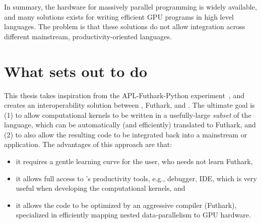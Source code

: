 
In summary, the hardware for massively parallel programming is widely available,
and many solutions exists for writing efficient GPU programs in high level
languages. The problem is that these solutions do not allow integration across
different mainstream, productivity-oriented languages.



\section{What \fshark{} sets out to do}

This thesis takes inspiration from the APL-Futhark-Python experiment~\cite{apltail}, 
and creates an interoperability solution between \fsharp{}, Futhark, and \csharp{}.
The ultimate goal is (1) to allow computational kernels to be written in a usefully-large
{\em subset} of the \fsharp{} language, which can be automatically (and efficiently)
translated to Futhark, and (2) to also allow the resulting code to be integrated
back into a mainstream \csharp{} or \fsharp{} application. 
The advantages of this approach are that:
\begin{itemize}
    \item it requires a gentle learning curve for the user, who needs not learn Futhark, 
    \item it allows full access to \fsharp{}'s productivity tools, e.g., debugger, IDE,
            which is very useful when developing the computational kernels, and 
    \item it allows the code to be optimized by an aggressive compiler (Futhark),
            specialized in efficiently mapping nested data-parallelism to GPU hardware.  
\end{itemize}


